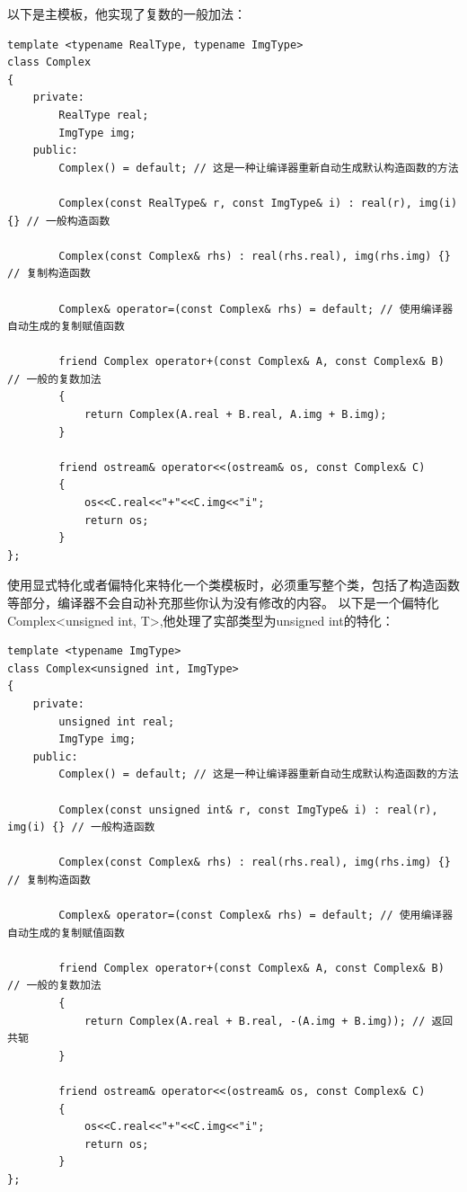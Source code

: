 \documentclass[UTF8]{ctexart}
\begin{document}
以下是主模板，他实现了复数的一般加法：
\begin{lstlisting}
template <typename RealType, typename ImgType>
class Complex
{
    private:
        RealType real;
        ImgType img;
    public:
        Complex() = default; // 这是一种让编译器重新自动生成默认构造函数的方法
        
        Complex(const RealType& r, const ImgType& i) : real(r), img(i) {} // 一般构造函数
        
        Complex(const Complex& rhs) : real(rhs.real), img(rhs.img) {} // 复制构造函数
        
        Complex& operator=(const Complex& rhs) = default; // 使用编译器自动生成的复制赋值函数

        friend Complex operator+(const Complex& A, const Complex& B) // 一般的复数加法
        {
            return Complex(A.real + B.real, A.img + B.img);
        }

        friend ostream& operator<<(ostream& os, const Complex& C)
        {
            os<<C.real<<"+"<<C.img<<"i";
            return os;
        }
};
\end{lstlisting}

使用显式特化或者偏特化来特化一个类模板时，必须重写整个类，包括了构造函数等部分，编译器不会自动补充那些你认为没有修改的内容。 以下是一个偏特化Complex<unsigned int, T>,他处理了实部类型为unsigned int的特化：
\begin{lstlisting}
template <typename ImgType>
class Complex<unsigned int, ImgType>
{
    private:
        unsigned int real;
        ImgType img;
    public:
        Complex() = default; // 这是一种让编译器重新自动生成默认构造函数的方法
        
        Complex(const unsigned int& r, const ImgType& i) : real(r), img(i) {} // 一般构造函数
        
        Complex(const Complex& rhs) : real(rhs.real), img(rhs.img) {} // 复制构造函数
        
        Complex& operator=(const Complex& rhs) = default; // 使用编译器自动生成的复制赋值函数

        friend Complex operator+(const Complex& A, const Complex& B) // 一般的复数加法
        {
            return Complex(A.real + B.real, -(A.img + B.img)); // 返回共轭
        }

        friend ostream& operator<<(ostream& os, const Complex& C)
        {
            os<<C.real<<"+"<<C.img<<"i";
            return os;
        }
};
\end{lstlisting}
\end{document}
